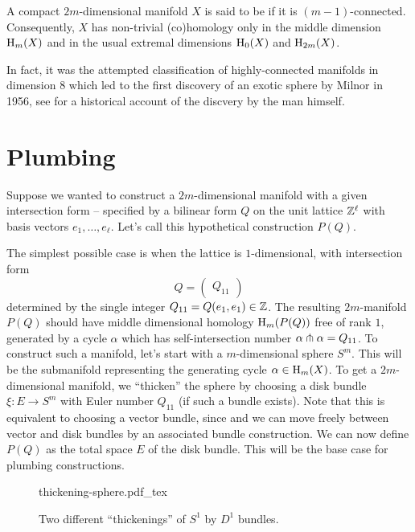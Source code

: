 \begin{definition}
	A compact $2m$-dimensional manifold $X$ is said to be  if it is $(m-1)$-connected. Consequently, $X$ has non-trivial (co)homology only in the middle dimension $\operatorname{H}_m(X)$ and in the usual extremal dimensions $\operatorname{H}_0(X)$ and $\operatorname{H}_{2m}(X)$.
\end{definition}

\begin{remark}
	In fact, it was the attempted classification of highly-connected manifolds in dimension $8$ which led to the first discovery of an exotic sphere by Milnor in 1956, see \cite{milnor2000exotic} for a historical account of the discvery by the man himself.
\end{remark}

\section{Plumbing}

Suppose we wanted to construct a $2m$-dimensional manifold with a given intersection form -- specified by a bilinear form $Q$ on the unit lattice $\mathbb{Z}^\ell$ with basis vectors $e_1,\ldots, e_\ell$. Let's call this hypothetical construction $P(Q)$.

The simplest possible case is when the lattice is $1$-dimensional, with intersection form
\[
	Q = \begin{pmatrix} Q_{11}\end{pmatrix}
\]
determined by the single integer $Q_{11}=Q(e_1,e_1)\in \mathbb{Z}$.
The resulting $2m$-manifold $P(Q)$ should have middle dimensional homology $\operatorname{H}_m(P(Q))$ free of rank $1$, generated by a cycle $\alpha$ which has self-intersection number $\alpha\pitchfork \alpha = Q_{11}$. To construct such a manifold, let's start with a $m$-dimensional sphere $S^m$. This will be the submanifold representing the generating cycle $\alpha\in \operatorname{H}_m(X)$. To get a $2m$-dimensional manifold, we ``thicken'' the sphere by choosing a disk bundle $\xi : E \to S^m$ with Euler number $Q_{11}$ (if such a bundle exists). Note that this is equivalent to choosing a vector bundle, since and we can move freely between vector and disk bundles by an associated bundle construction. We can now define $P(Q)$ as the total space $E$ of the disk bundle. This will be the base case for plumbing constructions.
\begin{figure}[ht]
	\centering
	{thickening-sphere.pdf_tex}
	\caption{Two different ``thickenings'' of $S^1$ by $D^1$ bundles.}\label{fig:thickening-sphere}
\end{figure}

